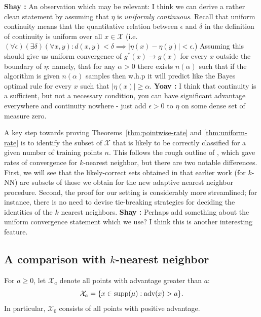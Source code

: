 \documentclass{article}
\def\X{{\mathcal X}}
\def\supp{{\rm supp}}
\def\adv{{\rm adv}}
\newcommand{\eps}{\epsilon}
\newcommand{\comment}[3]{{\color{#1} {\bf #2 :} #3}}
\newcommand{\shay}[1]{\comment{purple}{Shay}{#1}}
\newcommand{\yoav}[1]{\comment{cyan}{Yoav}{#1}}
\begin{document}
\shay{An observation which may be relevant: 
I think we can derive a rather clean statement by assuming that $\eta$ is {\it uniformly continuous}.
Recall that uniform continuity means that the quantitative relation between $\eps$ and $\delta$
in the definition of continuity is uniform over all $x\in \X$ 
(i.e.\ $(\forall \epsilon)(\exists\delta)(\forall x,y):d(x,y)<\delta \implies \lvert\eta(x)-\eta(y) \rvert<\epsilon$.)
Assuming this should give us uniform convergence of $g^*(x)\to g(x)$ for every $x$ outside the boundary of $\eta$:
namely, that for any $\alpha>0$ there exists $n(\alpha)$ 
such that if the algorithm is given $n(\alpha)$ samples then w.h.p it will predict like the Bayes optimal rule
for every $x$ such that $\lvert\eta(x)\rvert \geq \alpha$. }
\yoav{I think that continuity is a sufficient, but not a necessary condition, you can have
  significant advantage everywhere and continuity nowhere - just add
  $\epsilon>0$ to $\eta$ on some dense set of measure zero.}


A key step towards proving Theorems~\ref{thm:pointwise-rate} and \ref{thm:uniform-rate} is to identify the subset of $\X$ that is likely to be correctly classified for a given number of training points $n$. This follows the rough outline of \cite{ChaudhuriDasgupta2014}, which gave rates of convergence for $k$-nearest neighbor, but there are two notable differences. First, we will see that the likely-correct sets obtained in that earlier work (for $k$-NN) are subsets of those we obtain for the new adaptive nearest neighbor procedure. Second, the proof for our setting is considerably more streamlined; for instance, there is no need to devise tie-breaking strategies for deciding the identities of the $k$ nearest neighbors.
\shay{Perhaps add something about the uniform convergence statement which we use? 
I think this is another interesting feature.}



\subsection{A comparison with $k$-nearest neighbor}
\label{sec:knn-comparison}

For $a \geq 0$, let $\X_a$ denote all points with advantage greater than $a$:
\begin{equation}
\X_a = \{x \in \supp(\mu): \adv(x) > a \} .
\label{eq:advantage-set}
\end{equation}
In particular, $\X_0$ consists of all points with positive advantage. 
\end{document}
